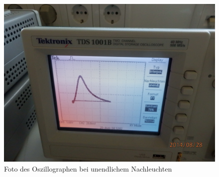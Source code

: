 \documentclass[12pt]{scrartcl}
\begin{document}
\begin{figure}[htbp] 
  \centering
    \includegraphics[scale = 0.2]{aufgabe3_2.JPG}
  	\caption[Foto des Oszillographen bei unendlichem Nachleuchten]{Foto des Oszillographen bei unendlichem Nachleuchten}
  \label{fig:teil_6}
\end{figure}
\end{document}
